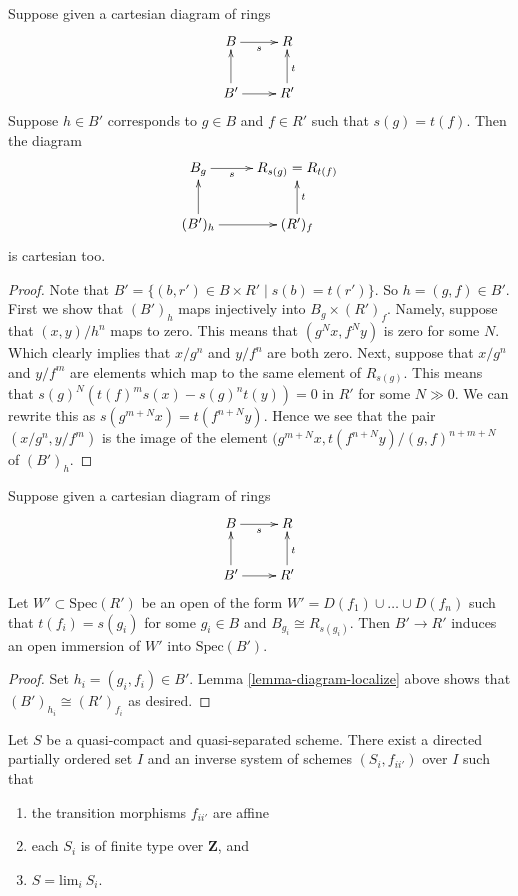 \begin{lemma}
\label{lemma-diagram-localize}
Suppose given a cartesian diagram of rings
$$
\xymatrix{
B \ar[r]_s & R \\
B'\ar[u] \ar[r] & R' \ar[u]_{t}
}
$$
Suppose $h \in B'$ corresponds to $g \in B$
and $f \in R'$ such that $s(g) = t(f)$.
Then the diagram
$$
\xymatrix{
B_g \ar[r]_-s & R_{s(g)} = R_{t(f)} \\
(B')_h \ar[u] \ar[r] & (R')_f \ar[u]_{t}
}
$$
is cartesian too.
\end{lemma}

\begin{proof}
Note that $B' = \{(b, r') \in B \times R' \mid s(b) = t(r')\}$.
So $h = (g, f) \in B'$. First we show that $(B')_h$ maps
injectively into $B_g \times (R')_f$. Namely, suppose that
$(x, y)/h^n$ maps to zero. This means that
$(g^Nx, f^Ny)$ is zero for some $N$. Which clearly implies
that $x/g^n$ and $y/f^n$ are both zero.
Next, suppose that $x/g^n$ and $y/f^m$ are elements
which map to the same element of $R_{s(g)}$.
This means that $s(g)^N(t(f)^ms(x) - s(g)^nt(y)) = 0$ in $R'$
for some $N \gg 0$. We can rewrite this as
$s(g^{m + N}x) = t(f^{n + N}y)$. Hence we see that the
pair $(x/g^n, y/f^m)$ is the image of the element
$(g^{m + N}x, t(f^{n + N}y)/(g, f)^{n + m + N}$ of
$(B')_h$.
\end{proof}

\begin{lemma}
\label{lemma-diagram}
Suppose given a cartesian diagram of rings
$$
\xymatrix{
B \ar[r]_s & R \\
B'\ar[u] \ar[r] & R' \ar[u]_{t}
}
$$
Let $W' \subset \text{Spec}(R')$ be an open of
the form $W' = D(f_1) \cup \ldots \cup D(f_n)$
such that $t(f_i) = s(g_i)$ for some $g_i \in B$
and $B_{g_i} \cong R_{s(g_i)}$. Then $B' \to R'$
induces an open immersion of $W'$ into $\text{Spec}(B')$.
\end{lemma}

\begin{proof}
Set $h_i = (g_i, f_i) \in B'$.
Lemma \ref{lemma-diagram-localize} above shows that
$(B')_{h_i} \cong (R')_{f_i}$ as desired.
\end{proof}

\begin{proposition}
\label{proposition-approximate}
Let $S$ be a quasi-compact and quasi-separated scheme.
There exist a directed partially ordered set $I$
and an inverse system of schemes $(S_i, f_{ii'})$ over $I$
such that
\begin{enumerate}
\item the transition morphisms $f_{ii'}$ are affine
\item each $S_i$ is of finite type over $\mathbf{Z}$, and
\item $S = \text{lim}_i\ S_i$.
\end{enumerate}
\end{proposition}

